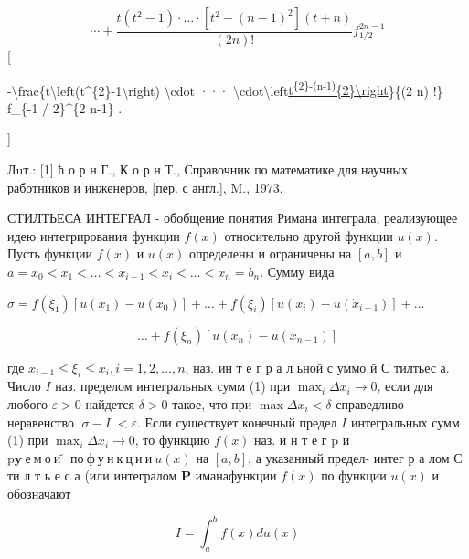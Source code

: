 \documentclass[10pt]{article}
\begin{document}
\[

\cdots+\frac{t\left(t^{2}-1\right) \cdot \ldots \cdot\left[t^{2}-(n-1)^{2}\right](t+n)}{(2 n) !} f_{1 / 2}^{2 n-1}

\][



-\textbackslash frac\{t\textbackslash left(t\^{}\{2\}-1\textbackslash right) \textbackslash cdot ··· \textbackslash cdot\textbackslash left\href{t-n}{t\textsuperscript{\{2\}-(n-1)}\{2\}\textbackslash right}\}\{(2 n) !\} f\_\{-1 / 2\}\^{}\{2 n-1\} .

]



Лuт.: [1] ћ о р н Г., К о р н Т., Справочник по математике для научных работников и инженеров, [пер. с англ.], M., 1973.



СТИЛТЬЕСА ИНТЕГРАЛ - обобщение понятия Римана интеграла, реализующее идею интегрирования функции $f(x)$ относительно другой функции $u(x)$. Пусть функции $f(x)$ и $u(x)$ определены и ограничены на $[a, b]$ и $a=x_{0}<x_{1}<\ldots<x_{i-1}<x_{i}<\ldots<x_{n}=b_{n}$. Сумму вида



$\sigma=f\left(\xi_{1}\right)\left[u\left(x_{1}\right)-u\left(x_{0}\right)\right]+\ldots+f\left(\xi_{i}\right)\left[u\left(x_{i}\right)-u\left(\dot{x}_{i-1}\right)\right]+\ldots$



\[

\ldots+f\left(\xi_{n}\right)\left[u\left(x_{n}\right)-u\left(x_{n-1}\right)\right]

\]



где $x_{i-1} \leqslant \xi_{i} \leqslant x_{i}, i=1,2, \ldots, n$, наз. ин т е г р а л ьной с уммо й С тилтьес а. Число $I$ наз. пределом интегральных сумм (1) при $\max _{i} \Delta x_{i} \rightarrow 0$, если для любого $\varepsilon>0$ найдется $\delta>0$ такое, что при $\max \Delta x_{i}<\delta$ справедливо неравенство $|\sigma-I|<\varepsilon$. Если существует конечный предел $I$ интегральных сумм (1) при $\max _{i} \Delta x_{i} \rightarrow 0$, то функцию $f(x)$ наз. и н т е г p и$\mathrm{p} \mathbf{y} \mathbf{~ е ~ м ~ о ~ и ̆ ~ п о ~ ф ~ у ~ н ~ к ~ ц ~ и ~ и ~} u(x)$ на $[a, b]$, а указанный предел- интег р а лом С ти л т ь е с а (или интегралом $\mathbf{P}$ иманафункции $f(x)$ по функции $u(x)$ и обозначают



\[

I=\int_{a}^{b} f(x) d u(x)

\]
\end{document}
